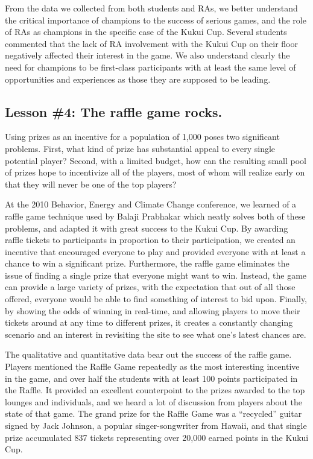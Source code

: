 \documentclass{acm_proc_article-sp}
\begin{document}
From the data we collected from both students and RAs, we better understand the critical importance of champions to the success of serious games, and the role of RAs as champions in the specific case of the Kukui Cup.  Several students commented that the lack of RA involvement with the Kukui Cup on their floor negatively affected their interest in the game.  We also understand clearly the need for champions to be first-class participants with at least the same level of opportunities and experiences as those they are supposed to be leading.

\subsection{Lesson \#4: The raffle game rocks.}

Using prizes as an incentive for a population of 1,000 poses two significant problems.  First, what kind of prize has substantial appeal to every single potential player?  Second, with a limited budget, how can the resulting small pool of prizes hope to incentivize all of the players, most of whom will realize early on that they will never be one of the top players?

At the 2010 Behavior, Energy and Climate Change conference, we learned of a raffle game technique used by Balaji Prabhakar which neatly solves both of these problems, and adapted it with great success to the Kukui Cup.  By awarding raffle tickets to participants in proportion to their participation, we created an incentive that encouraged everyone to play and provided everyone with at least a chance to win a significant prize.   Furthermore, the raffle game eliminates the issue of finding a single prize that everyone might want to win. Instead, the game can provide a large variety of prizes, with the expectation that out of all those offered, everyone would be able to find something of interest to bid upon.  Finally, by showing the odds of winning in real-time, and allowing players to move their tickets around at any time to different prizes, it creates a constantly changing scenario and an interest in revisiting the site to see what one's latest chances are. 

The qualitative and quantitative data bear out the success of the raffle game.  Players mentioned the Raffle Game repeatedly as the most interesting incentive in the game, and over half the students with at least 100 points participated in the Raffle.   It provided an excellent counterpoint to the prizes awarded to the top lounges and individuals, and we heard a lot of discussion from players about the state of that game.   The grand prize for the Raffle Game was a ``recycled'' guitar signed by Jack Johnson, a popular singer-songwriter from Hawaii, and that single prize accumulated 837 tickets representing over 20,000 earned points in the Kukui Cup.
\end{document}
